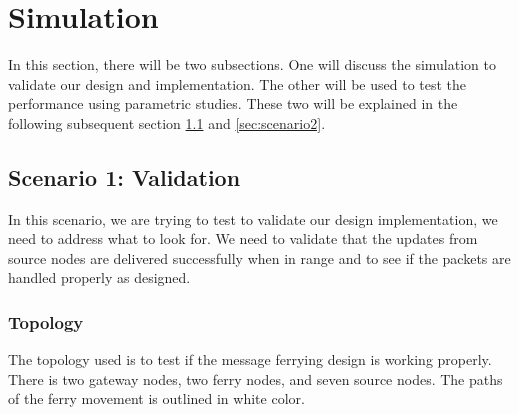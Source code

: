 \chapter{Simulation} 

In this section, there will be two subsections.  One will discuss the simulation to validate our design and implementation.  The other will be used to test the performance using parametric studies.  These two will be explained in the following subsequent section \ref{sec:scenario1} and \ref{sec:scenario2}.



\section{Scenario 1: Validation}
\label{sec:scenario1}

In this scenario, we are trying to test to validate our design implementation, we need to address what to look for.  We need to validate that the updates from source nodes are delivered successfully when in range and to see if the packets are handled properly as designed.  

\subsection{Topology}

The topology used is to test if the message ferrying design is working properly.  There is two gateway nodes, two ferry nodes, and seven source nodes.  The paths of the ferry movement is outlined in white color.  

